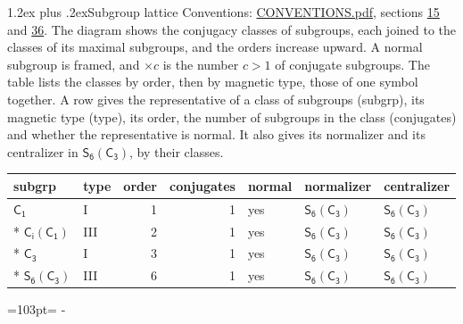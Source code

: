 \documentclass[10pt,a4paper]{article}
\makeatletter
\renewcommand\section{\@startsection{section}{1}{\z@}{-3ex plus -1ex minus -.2ex}%
  {1.2ex plus .2ex}{\normalfont\large\sffamily\bfseries\color{parttitle}}}
\newcommand{\needspace}[1]{\par\penalty-100\begingroup\dimen0=#1\relax\dimen2=\pagegoal
  \advance\dimen2-\pagetotal\ifdim\dimen0>\dimen2\relax\ifdim\dimen2>0pt\vfil\break\fi\fi
  \endgroup}
\numberwithin{equation}{section}
\newcommand{\grp}[1]{\mathsf{#1}}
\makeatother
\begin{document}
\section{Subgroup lattice}\label{s:subgroups}
Conventions: \href{../../CONVENTIONS.pdf}{CONVENTIONS.pdf}, sections \href{../../../rotation/CONVENTIONS.pdf\#conv.15}{15} and \href{../../CONVENTIONS.pdf\#conv.36}{36}.
The diagram shows the conjugacy classes of subgroups, each joined to the classes of its maximal subgroups, and the orders increase upward. \label{n:index.conjugates.c}A normal subgroup is framed, and ${\times}c$ is the number $c > 1$ of conjugate subgroups. The table lists the classes by order, then by magnetic type, those of one symbol together. \label{n:head.subgroup}\label{n:head.magnetic.type}\label{n:head.order}\label{n:head.conjugates}\label{n:head.normal}A row gives the representative of a class of subgroups (subgrp), its magnetic type (type), its order, the number of subgroups in the class (conjugates) and whether the representative is normal. \label{n:head.normalizer}\label{n:head.centralizer}It also gives its normalizer and its centralizer in $\grp{S_{6}}(\grp{C_{3}})$, by their classes. 
\begin{center}
\end{center}
{\small\begin{longtable}{@{}llrrlll@{}}\toprule
subgrp & type & order & conjugates & normal & normalizer & centralizer\\\midrule\endhead
\bottomrule\endfoot\endlastfoot
\href{../../../rotation/data/pdf/C1.pdf}{$\grp{C_{1}}$} & I & 1 & 1 & yes & \href{S6-C3.pdf}{$\grp{S_{6}}(\grp{C_{3}})$} & \href{S6-C3.pdf}{$\grp{S_{6}}(\grp{C_{3}})$}\\*
\href{S2-C1.pdf}{$\grp{C_{i}}(\grp{C_{1}})$} & III & 2 & 1 & yes & \href{S6-C3.pdf}{$\grp{S_{6}}(\grp{C_{3}})$} & \href{S6-C3.pdf}{$\grp{S_{6}}(\grp{C_{3}})$}\\*
\href{../../../rotation/data/pdf/C3.pdf}{$\grp{C_{3}}$} & I & 3 & 1 & yes & \href{S6-C3.pdf}{$\grp{S_{6}}(\grp{C_{3}})$} & \href{S6-C3.pdf}{$\grp{S_{6}}(\grp{C_{3}})$}\\*
\href{S6-C3.pdf}{$\grp{S_{6}}(\grp{C_{3}})$} & III & 6 & 1 & yes & \href{S6-C3.pdf}{$\grp{S_{6}}(\grp{C_{3}})$} & \href{S6-C3.pdf}{$\grp{S_{6}}(\grp{C_{3}})$}\\
\bottomrule\end{longtable}}
\needspace{103pt}
\end{document}
